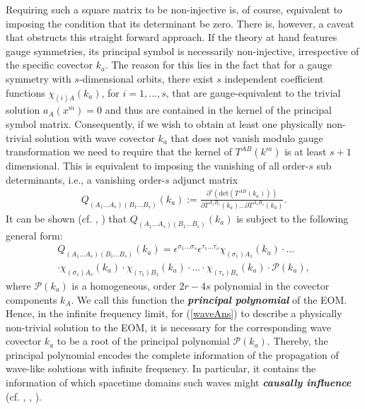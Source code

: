 \documentclass[%
 reprint,
nofootinbib,
 amsmath,amssymb,
 aps,
 prd,
floatfix,
]{revtex4-2}
\begin{document}
Requiring such a square matrix to be non-injective is, of course, equivalent to imposing the condition that its determinant be zero. There is, however, a caveat that obstructs this straight forward approach. If the theory at hand features gauge symmetries, its principal symbol is necessarily non-injective, irrespective of the specific covector $k_a$. 
The reason for this lies in the fact that for a gauge symmetry with $s$-dimensional orbits, there exist $s$ independent coefficient functions $\chi_{(i)A}(k_a)$, for $i = 1,...,s$, that are gauge-equivalent to the trivial solution $a_A(x^m)=0$ and thus are contained in the kernel of the principal symbol matrix. 
Consequently, if we wish to obtain at least one physically non-trivial solution with wave covector $k_a$ that does not vanish modulo gauge transformation we need to require that the kernel of $T^{AB}(k^m)$ is at least $s+1$ dimensional. This is equivalent to imposing the vanishing of all order-$s$ sub determinants, i.e., a vanishing order-$s$ adjunct matrix
\begin{align}
    Q_{(A_1...A_s) (B_1...B_s)}(k_a) := \frac{\partial^s (\mathrm{det}(T^{AB}(k_a)))}{\partial T^{A_1 B_1}(k_a) ... \partial T^{A_s B_s}(k_a)}.
\end{align}  
It can be shown (cf. \cite{2018PhRvD..97h4036D}, \cite{2009JPhA...42U5402I}) that $Q_{(A_1...A_s) (B_1...B_s)}(k_a)$ is subject to the following general form:
\begin{multline}
    Q_{(A_1...A_s) (B_1...B_s)}(k_a) = \epsilon^{\sigma_1...\sigma_s} \epsilon^{\tau_1...\tau_s} \chi_{(\sigma_1)A_1}(k_a) \cdot ... \\
    \cdot \chi_{(\sigma_s)A_s}(k_a) \cdot \chi_{(\tau_1)B_1}(k_a) \cdot ... \cdot \chi_{(\tau_s)B_s}(k_a) \cdot \mathcal{P}(k_a),
\end{multline}
where $\mathcal{P}(k_a)$ is a homogeneous, order $2r-4s$ polynomial in the covector components $k_A$. We call this function the \textit{\textbf{principal polynomial}} of the EOM.
Hence, in the infinite frequency limit, for (\ref{waveAns}) to describe a physically non-trivial solution to the EOM, it is necessary for the corresponding wave covector $k_a$ to be a root of the principal polynomial $\mathcal{P}(k_a)$. 
Thereby, the principal polynomial encodes the complete information of the propagation of wave-like solutions with infinite frequency. In particular, it contains the information of which spacetime domains such waves might \textit{\textbf{causally influence}} (cf. \cite{2012arXiv1211.1914K}, \cite{seiler2009involution}, \cite{2011PhRvD..83d4047R}).
\end{document}
